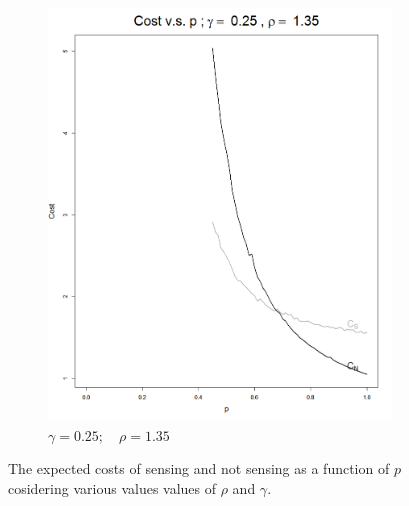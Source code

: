 \documentclass[11pt]{article}
\numberwithin{equation}{section}
\begin{document}
\begin{figure}[h!]
\begin{subfigure}[b]{0.49\textwidth}
	\includegraphics[width=\textwidth]{cost_vs_p_025_135}
		\caption{$\gamma=0.25;\quad\rho=1.35$}
		\label{cost_vs_p_025_135}
	\end{subfigure}
	\caption{The expected costs of sensing and not sensing as a function of $p$ cosidering various values values of $\rho$ and $\gamma$.}\label{CostVsP}
\end{figure}

\newpage
\begin{thebibliography}{99}

%
%
%
%
%

\end{thebibliography}
\end{document}
